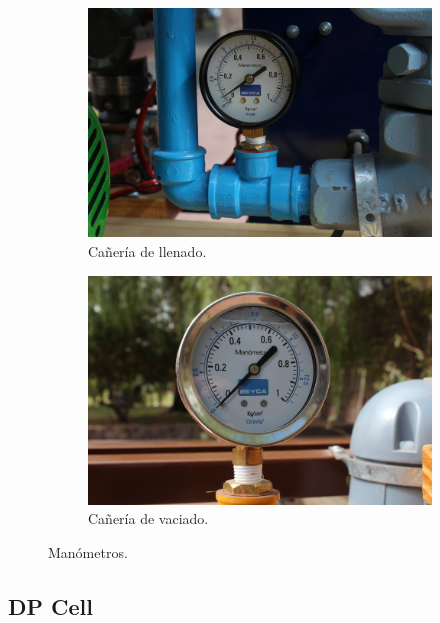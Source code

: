 \begin{figure}[t]
        \centering
        \begin{subfigure}[b]{0.48\textwidth}
\includegraphics[width=\textwidth]
	{Cap2-DisenoEnsamblado/images/manometro1.JPG}
	\caption{Cañería de llenado.}
        \end{subfigure}%
        \hfill
        \begin{subfigure}[b]{0.48\textwidth}
\includegraphics[width=\textwidth]
	{Cap2-DisenoEnsamblado/images/manometro2.JPG}
	\caption{Cañería de vaciado.}
        \end{subfigure}
        \caption{Manómetros.}
        \label{fig:manometro}
\end{figure}

\subsection{DP Cell}
\label{subsec:DPCell}

